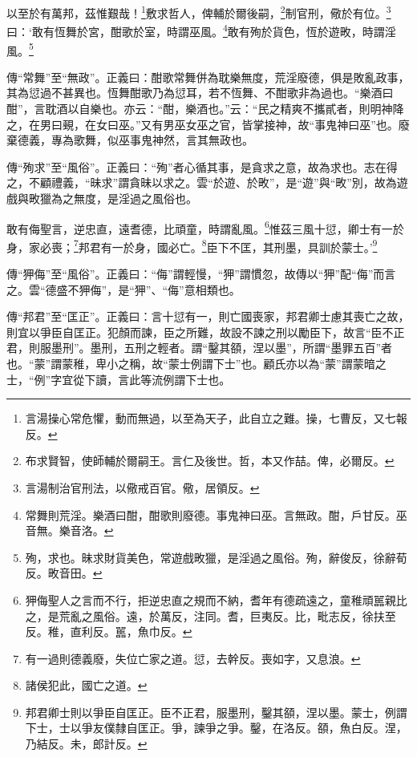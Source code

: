 以至於有萬邦，茲惟艱哉！\footnote{言湯操心常危懼，動而無過，以至為天子，此自立之難。操，七曹反，又七報反。}敷求哲人，俾輔於爾後嗣，\footnote{布求賢智，使師輔於爾嗣王。言仁及後世。哲，本又作喆。俾，必爾反。}制官刑，儆於有位。\footnote{言湯制治官刑法，以儆戒百官。儆，居領反。}曰：‘敢有恆舞於宮，酣歌於室，時謂巫風。\footnote{常舞則荒淫。樂酒曰酣，酣歌則廢德。事鬼神曰巫。言無政。酣，戶甘反。巫音無。樂音洛。}敢有殉於貨色，恆於遊畋，時謂淫風。\footnote{殉，求也。昧求財貨美色，常遊戲畋獵，是淫過之風俗。殉，辭俊反，徐辭荀反。畋音田。}


{\noindent\zhuan{}\fzbyks 傳“常舞”至“無政”。正義曰：酣歌常舞併為耽樂無度，荒淫廢德，俱是敗亂政事，其為愆過不甚異也。恆舞酣歌乃為愆耳，若不恆舞、不酣歌非為過也。“樂酒曰酣”，言耽酒以自樂也。亦云：“酣，樂酒也。”云：“民之精爽不攜貳者，則明神降之，在男曰覡，在女曰巫。”又有男巫女巫之官，皆掌接神，故“事鬼神曰巫”也。廢棄德義，專為歌舞，似巫事鬼神然，言其無政也。 \par}

{\noindent\zhuan{}\fzbyks 傳“殉求”至“風俗”。正義曰：“殉”者心循其事，是貪求之意，故為求也。志在得之，不顧禮義，“昧求”謂貪昧以求之。雲“於遊、於畋”，是“遊”與“畋”別，故為遊戲與畋獵為之無度，是淫過之風俗也。 \par}

敢有侮聖言，逆忠直，遠耆德，比頑童，時謂亂風。\footnote{狎侮聖人之言而不行，拒逆忠直之規而不納，耆年有德疏遠之，童稚頑嚚親比之，是荒亂之風俗。遠，於萬反，注同。耆，巨夷反。比，毗志反，徐扶至反。稚，直利反。嚚，魚巾反。}惟茲三風十愆，卿士有一於身，家必喪；\footnote{有一過則德義廢，失位亡家之道。愆，去幹反。喪如字，又息浪。}邦君有一於身，國必亡。\footnote{諸侯犯此，國亡之道。}臣下不匡，其刑墨，具訓於蒙士。’\footnote{邦君卿士則以爭臣自匡正。臣不正君，服墨刑，鑿其頟，涅以墨。蒙士，例謂下士，士以爭友僕隸自匡正。爭，諫爭之爭。鑿，在洛反。頟，魚白反。涅，乃結反。未，郎計反。}

{\noindent\zhuan{}\fzbyks 傳“狎侮”至“風俗”。正義曰：“侮”謂輕慢，“狎”謂慣忽，故傳以“狎”配“侮”而言之。雲“德盛不狎侮”，是“狎”、“侮”意相類也。 \par}

{\noindent\zhuan{}\fzbyks 傳“邦君”至“匡正”。正義曰：言十愆有一，則亡國喪家，邦君卿士慮其喪亡之故，則宜以爭臣自匡正。犯顏而諫，臣之所難，故設不諫之刑以勵臣下，故言“臣不正君，則服墨刑”。墨刑，五刑之輕者。謂“鑿其頟，涅以墨”，所謂“墨罪五百”者也。“蒙”謂蒙稚，卑小之稱，故“蒙士例謂下士”也。顧氏亦以為“蒙”謂蒙暗之士，“例”字宜從下讀，言此等流例謂下士也。 \par}

